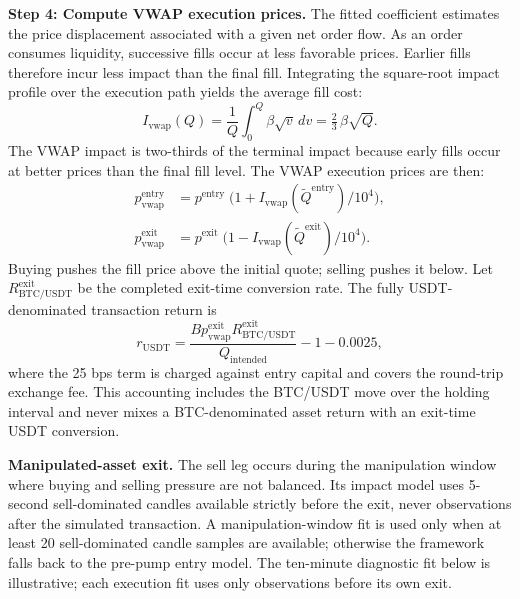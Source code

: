 \documentclass{ieeeaccess}
\begin{document}
\textbf{Step 4: Compute VWAP execution prices.} The fitted coefficient estimates the price displacement associated with a given net order flow. As an order consumes liquidity, successive fills occur at less favorable prices. Earlier fills therefore incur less impact than the final fill. Integrating the square-root impact profile over the execution path yields the average fill cost:
\begin{equation}
    I_{\mathrm{vwap}}(Q)
      = \frac{1}{Q}\int_{0}^{Q}\!\beta\sqrt{v}\,dv
      = \tfrac{2}{3}\,\beta\sqrt{Q}.
    \label{eq:vwap_correction}
\end{equation}
The VWAP impact is two-thirds of the terminal impact because early fills occur at better prices than the final fill level. The VWAP execution prices are then:
\begin{align}
    p^{\mathrm{entry}}_{\mathrm{vwap}} &= p^{\mathrm{entry}}\;\bigl(1 + I_{\mathrm{vwap}}(\widetilde Q^{\mathrm{entry}}) / 10^4\bigr), \label{eq:vwap_entry}\\
    p^{\mathrm{exit}}_{\mathrm{vwap}}  &= p^{\mathrm{exit}}\;\bigl(1 - I_{\mathrm{vwap}}(\widetilde Q^{\mathrm{exit}}) / 10^4\bigr). \label{eq:vwap_exit}
\end{align}
Buying pushes the fill price above the initial quote; selling pushes it below. Let $R^{\mathrm{exit}}_{\mathrm{BTC/USDT}}$ be the completed exit-time conversion rate. The fully USDT-denominated transaction return is
\begin{equation}
    r_{\mathrm{USDT}}
      = \frac{B p^{\mathrm{exit}}_{\mathrm{vwap}} R^{\mathrm{exit}}_{\mathrm{BTC/USDT}}}
             {Q_{\mathrm{intended}}}
        - 1 - 0.0025,
    \label{eq:tx_return}
\end{equation}
where the 25 bps term is charged against entry capital and covers the round-trip exchange fee. This accounting includes the BTC/USDT move over the holding interval and never mixes a BTC-denominated asset return with an exit-time USDT conversion.

\textbf{Manipulated-asset exit.} The sell leg occurs during the manipulation window where buying and selling pressure are not balanced. Its impact model uses 5-second sell-dominated candles available strictly before the exit, never observations after the simulated transaction. A manipulation-window fit is used only when at least 20 sell-dominated candle samples are available; otherwise the framework falls back to the pre-pump entry model. The ten-minute diagnostic fit below is illustrative; each execution fit uses only observations before its own exit.
\end{document}
